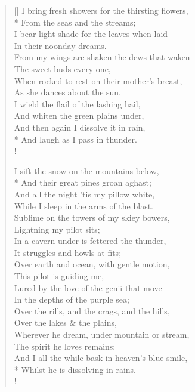 \documentclass[MAIN]{subfiles}
\begin{document}
\settowidth{\versewidth}{I bring fresh showers for the thirsting flowers,}
\begin{verse}[\versewidth]
I bring fresh showers for the thirsting flowers,\\*
\vin From the seas and the streams;\\
I bear light shade for the leaves when laid\\
\vin In their noonday dreams.\\
From my wings are shaken the dews that waken\\
\vin The sweet buds every one,\\
When rocked to rest on their mother's breast,\\
\vin As she dances about the sun.\\
I wield the flail of the lashing hail,\\
\vin And whiten the green plains under,\\
And then again I dissolve it in rain,\\*
\vin And laugh as I pass in thunder.\\!

I sift the snow on the mountains below,\\*
\vin And their great pines groan aghast;\\
And all the night 'tis my pillow white,\\
\vin While I sleep in the arms of the blast.\\
Sublime on the towers of my skiey bowers,\\
\vin Lightning my pilot sits;\\
In a cavern under is fettered the thunder,\\
\vin It struggles and howls at fits;\\
Over earth and ocean, with gentle motion,\\
\vin This pilot is guiding me,\\
Lured by the love of the genii that move\\
\vin In the depths of the purple sea;\\
Over the rills, and the crags, and the hills,\\
\vin Over the lakes \& the plains,\\
Wherever he dream, under mountain or stream,\\
\vin The spirit he loves remains;\\
And I all the while bask in heaven's blue smile,\\*
\vin Whilst he is dissolving in rains.\\!


\end{verse}
\end{document}
